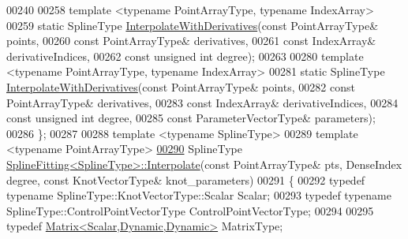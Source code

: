 \begin{DoxyCode}
00240 
00258     \textcolor{keyword}{template} <\textcolor{keyword}{typename} Po\textcolor{keywordtype}{int}ArrayType, \textcolor{keyword}{typename} IndexArray>
00259     \textcolor{keyword}{static} SplineType \hyperlink{group___splines___module_a7bd937fdcfa168dbdc27932886a4da9f}{InterpolateWithDerivatives}(\textcolor{keyword}{const} PointArrayType& points,
00260                                                  \textcolor{keyword}{const} PointArrayType& derivatives,
00261                                                  \textcolor{keyword}{const} IndexArray& derivativeIndices,
00262                                                  \textcolor{keyword}{const} \textcolor{keywordtype}{unsigned} \textcolor{keywordtype}{int} degree);
00263 
00280     \textcolor{keyword}{template} <\textcolor{keyword}{typename} Po\textcolor{keywordtype}{int}ArrayType, \textcolor{keyword}{typename} IndexArray>
00281     \textcolor{keyword}{static} SplineType \hyperlink{group___splines___module_a7bd937fdcfa168dbdc27932886a4da9f}{InterpolateWithDerivatives}(\textcolor{keyword}{const} PointArrayType& points,
00282                                                  \textcolor{keyword}{const} PointArrayType& derivatives,
00283                                                  \textcolor{keyword}{const} IndexArray& derivativeIndices,
00284                                                  \textcolor{keyword}{const} \textcolor{keywordtype}{unsigned} \textcolor{keywordtype}{int} degree,
00285                                                  \textcolor{keyword}{const} ParameterVectorType& parameters);
00286   \};
00287 
00288   \textcolor{keyword}{template} <\textcolor{keyword}{typename} SplineType>
00289   \textcolor{keyword}{template} <\textcolor{keyword}{typename} Po\textcolor{keywordtype}{int}ArrayType>
\hyperlink{group___splines___module_af08185c8b635283f7c76efe91576cc83}{00290}   SplineType \hyperlink{group___splines___module_adc80b6f0dd0dbbea28130fb254626874}{SplineFitting<SplineType>::Interpolate}(\textcolor{keyword}{const} 
      PointArrayType& pts, DenseIndex degree, \textcolor{keyword}{const} KnotVectorType& knot\_parameters)
00291   \{
00292     \textcolor{keyword}{typedef} \textcolor{keyword}{typename} SplineType::KnotVectorType::Scalar Scalar;      
00293     \textcolor{keyword}{typedef} \textcolor{keyword}{typename} SplineType::ControlPointVectorType ControlPointVectorType;      
00294 
00295     \textcolor{keyword}{typedef} \hyperlink{group___core___module}{Matrix<Scalar,Dynamic,Dynamic>} MatrixType;

\end{DoxyCode}

